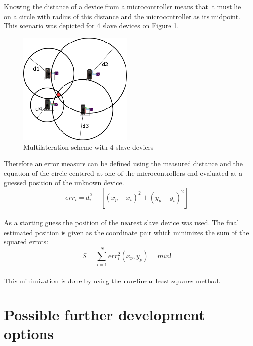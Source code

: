 \documentclass[11pt,a4paper]{article}
\begin{document}
\newpage

Knowing the distance of a device from a microcontroller means that it must lie on a circle with radius of this distance and the microcontroller as its midpoint. This scenario was depicted for 4 slave devices on Figure \ref{fig:multilateration}.

\begin{figure}[H]
    \centering
    \includegraphics[width = 0.5\textwidth]{figures/multilateration.png}
    \caption{Multilateration scheme with 4 slave devices}
    \label{fig:multilateration}
\end{figure}

Therefore an error measure can be defined using the measured distance and the equation of the circle centered at one of the microcontrollers end evaluated at a guessed position of the unknown device.\\

\begin{equation*}
    err_i = d_i^2 - \left[(x_p - x_i)^2 + (y_p - y_i)^2 \right]
\end{equation*}\\

As a starting guess the position of the nearest slave device was used. The final estimated position is given as the coordinate pair which minimizes the sum of the squared errors:\\

\begin{equation*}
    S = \sum_{i=1}^{N} err_i^2(x_p, y_p) = min!
\end{equation*}\\

This minimization is done by using the non-linear least squares method.

\newpage


\section{Possible further development options}
\end{document}
